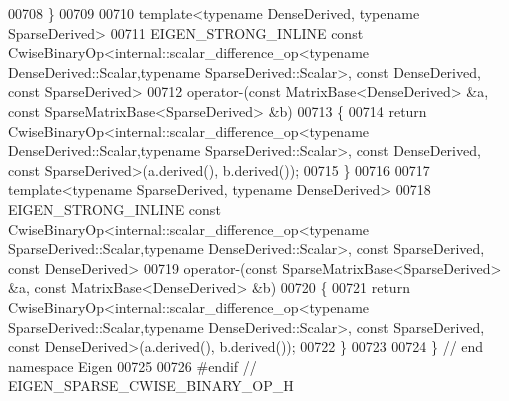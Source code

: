\begin{DoxyCode}
00708 \}
00709 
00710 \textcolor{keyword}{template}<\textcolor{keyword}{typename} DenseDerived, \textcolor{keyword}{typename} SparseDerived>
00711 EIGEN\_STRONG\_INLINE \textcolor{keyword}{const} CwiseBinaryOp<internal::scalar\_difference\_op<typename
       DenseDerived::Scalar,typename SparseDerived::Scalar>, \textcolor{keyword}{const} DenseDerived, \textcolor{keyword}{const} SparseDerived>
00712 operator-(\textcolor{keyword}{const} MatrixBase<DenseDerived> &a, \textcolor{keyword}{const} SparseMatrixBase<SparseDerived> &b)
00713 \{
00714   \textcolor{keywordflow}{return} CwiseBinaryOp<internal::scalar\_difference\_op<typename DenseDerived::Scalar,typename
       SparseDerived::Scalar>, \textcolor{keyword}{const} DenseDerived, \textcolor{keyword}{const} SparseDerived>(a.derived(), b.derived());
00715 \}
00716 
00717 \textcolor{keyword}{template}<\textcolor{keyword}{typename} SparseDerived, \textcolor{keyword}{typename} DenseDerived>
00718 EIGEN\_STRONG\_INLINE \textcolor{keyword}{const} CwiseBinaryOp<internal::scalar\_difference\_op<typename
       SparseDerived::Scalar,typename DenseDerived::Scalar>, \textcolor{keyword}{const} SparseDerived, \textcolor{keyword}{const} DenseDerived>
00719 operator-(\textcolor{keyword}{const} SparseMatrixBase<SparseDerived> &a, \textcolor{keyword}{const} MatrixBase<DenseDerived> &b)
00720 \{
00721   \textcolor{keywordflow}{return} CwiseBinaryOp<internal::scalar\_difference\_op<typename SparseDerived::Scalar,typename
       DenseDerived::Scalar>, \textcolor{keyword}{const} SparseDerived, \textcolor{keyword}{const} DenseDerived>(a.derived(), b.derived());
00722 \}
00723 
00724 \} \textcolor{comment}{// end namespace Eigen}
00725 
00726 \textcolor{preprocessor}{#endif // EIGEN\_SPARSE\_CWISE\_BINARY\_OP\_H}
\end{DoxyCode}
